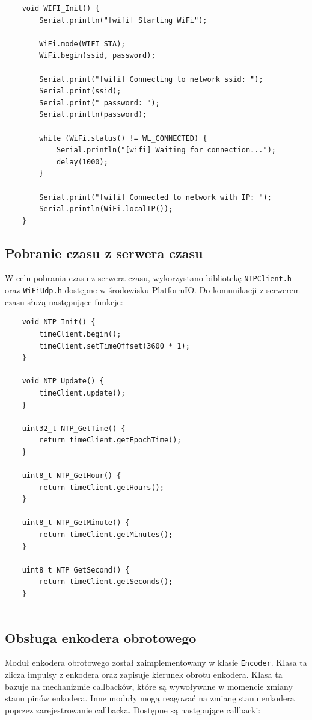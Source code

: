 \documentclass[../main.tex]{subfiles}
\begin{document}
\begin{verbatim}
    void WIFI_Init() {
        Serial.println("[wifi] Starting WiFi");
    
        WiFi.mode(WIFI_STA);
        WiFi.begin(ssid, password);
    
        Serial.print("[wifi] Connecting to network ssid: ");
        Serial.print(ssid);
        Serial.print(" password: ");
        Serial.println(password);
    
        while (WiFi.status() != WL_CONNECTED) {
            Serial.println("[wifi] Waiting for connection...");
            delay(1000);
        }
    
        Serial.print("[wifi] Connected to network with IP: ");
        Serial.println(WiFi.localIP());
    }
\end{verbatim}

\subsection{Pobranie czasu z serwera czasu}
W celu pobrania czasu z serwera czasu, wykorzystano bibliotekę \texttt{NTPClient.h} oraz \texttt{WiFiUdp.h} dostępne w środowisku PlatformIO.
Do komunikacji z serwerem czasu służą następujące funkcje:

\begin{verbatim}
    void NTP_Init() {
        timeClient.begin();
        timeClient.setTimeOffset(3600 * 1);
    }
    
    void NTP_Update() {
        timeClient.update();
    }
    
    uint32_t NTP_GetTime() {
        return timeClient.getEpochTime();
    }
    
    uint8_t NTP_GetHour() {
        return timeClient.getHours();
    }
    
    uint8_t NTP_GetMinute() {
        return timeClient.getMinutes();
    }
    
    uint8_t NTP_GetSecond() {
        return timeClient.getSeconds();
    }
    
\end{verbatim}

\subsection{Obsługa enkodera obrotowego}
Moduł enkodera obrotowego został zaimplementowany w klasie \texttt{Encoder}. Klasa ta zlicza impulsy z enkodera oraz zapisuje kierunek obrotu enkodera.
Klasa ta bazuje na mechanizmie callbacków, które są wywoływane w momencie zmiany stanu pinów enkodera. Inne moduły mogą reagować na zmianę stanu enkodera poprzez zarejestrowanie callbacka.
Dostępne są następujące callbacki:
\end{document}
